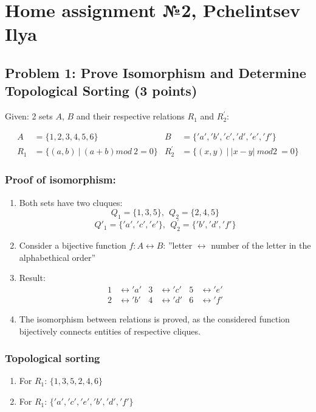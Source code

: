 \section{Home assignment №2, Pchelintsev Ilya}

\subsection{Problem 1: Prove Isomorphism and Determine
Topological Sorting (3 points)}

Given: 2 sets $A$, $B$ and their respective relations $R_1$ and $R^{'}_2$:

\begin{align*}
 A &= \{1,2,3,4,5,6\} &  B &=\{ 'a','b','c','d','e','f' \} \\
 R_1 &= \{ (a,b)\ |\ (a+b) mod\ 2 = 0\} & R^{'}_2 &= \{ (x,y)\ |\ |x-y|\ mod 2\ = 0 \}
\end{align*}

\subsubsection{Proof of isomorphism:}

\begin{enumerate}
\item Both sets have two cluques:
\[ Q_1 = \{1,3,5\},\ \ Q_2 = \{2,4,5\} \]
\[ Q{'}_1 = \{'a', 'c', 'e'\},\ \ Q^{'}_2 = \{'b','d','f'\} \]

\item Consider a bijective function $f: A \leftrightarrow B$: ''letter $\leftrightarrow$ number of the letter in the alphabethical order''
\item Result:
\begin{align*}
1 &\leftrightarrow 'a' & 3 &\leftrightarrow 'c' & 5 &\leftrightarrow 'e' \\
2 &\leftrightarrow 'b' & 4 &\leftrightarrow 'd' & 6 &\leftrightarrow 'f'
\end{align*}
\item The isomorphism between relations is proved, as the considered function bijectively connects entities of respective cliques. 
\end{enumerate}

\subsubsection{Topological sorting}

\begin{enumerate}
\item For $R_1$: $\{1, 3, 5, 2, 4, 6\}$
\item For $R_1$: $\{'a', 'c', 'e', 'b', 'd', 'f'\}$
\end{enumerate}


